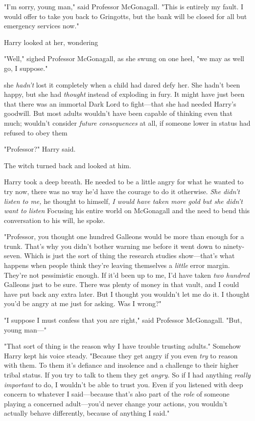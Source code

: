 "I'm sorry, young man," said Professor McGonagall. "This is entirely my fault.
I would offer to take you back to Gringotts, but the bank will be closed for
all but emergency services now."

Harry looked at her, wondering{\el}

"Well," sighed Professor McGonagall, as she swung on one heel, "we may as well
go, I suppose."

{\el} she \emph{hadn't} lost it completely when a child had dared defy her.
She hadn't been happy, but she had \emph{thought} instead of exploding in fury.
It might have just been that there was an immortal Dark Lord to fight—that
she had needed Harry's goodwill. But most adults wouldn't have been capable of
thinking even that much; wouldn't consider \emph{future consequences} at all,
if someone lower in status had refused to obey them{\el}

"Professor?" Harry said.

The witch turned back and looked at him.

Harry took a deep breath. He needed to be a little angry for what he wanted to
try now, there was no way he'd have the courage to do it otherwise. \emph{She
didn't listen to me,} he thought to himself, \emph{I would have taken more gold
but she didn't want to listen{\el}} Focusing his entire world on McGonagall
and the need to bend this conversation to his will, he spoke.

"Professor, you thought one hundred Galleons would be more than enough for a
trunk. That's why you didn't bother warning me before it went down to
ninety-seven. Which is just the sort of thing the research studies
show—that's what happens when people think they're leaving themselves a
\emph{little} error margin. They're not pessimistic enough. If it'd been up to
me, I'd have taken \emph{two hundred} Galleons just to be sure. There was
plenty of money in that vault, and I could have put back any extra later. But I
thought you wouldn't let me do it. I thought you'd be angry at me just for
asking. Was I wrong?"

"I suppose I must confess that you are right," said Professor McGonagall. "But,
young man—"

"That sort of thing is the reason why I have trouble trusting adults." Somehow
Harry kept his voice steady. "Because they get angry if you even \emph{try} to
reason with them. To them it's defiance and insolence and a challenge to their
higher tribal status. If you try to talk to them they get \emph{angry.} So if I
had anything \emph{really important} to do, I wouldn't be able to trust you.
Even if you listened with deep concern to whatever I said—because that's also
part of the \emph{role} of someone playing a concerned adult—you'd never
change your actions, you wouldn't actually behave differently, because of
anything I said."

